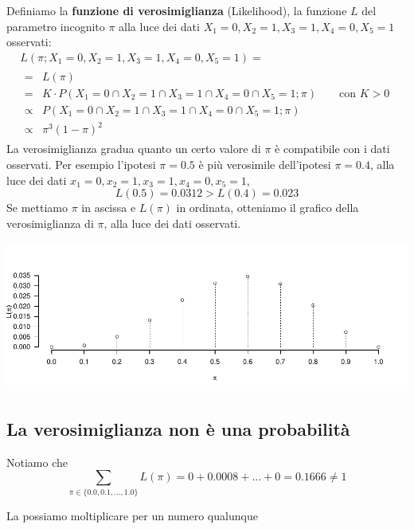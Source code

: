 \documentclass[
  11pt,
]{book}
\theoremstyle{mytheoremstyle}
\theoremstyle{mydefstyle}
\begin{document}
Definiamo la \textbf{funzione di verosimiglianza} (Likelihood), la funzione \(L\) del parametro incognito \(\pi\) alla luce dei dati \(X_1=0,X_2=1,X_3=1,X_4=0,X_5=1\) osservati:
\begin{multline*}
  L(\pi;X_1=0,X_2=1,X_3=1,X_4=0,X_5=1) =  \\
  \begin{array}{ll}
     = &L(\pi)\\
     = &K\cdot P(X_1=0\cap X_2=1\cap X_3=1\cap X_4=0\cap X_5=1;\pi) \qquad \text{con $K> 0$}\\
     \propto & P(X_1=0\cap X_2=1\cap X_3=1\cap X_4=0\cap X_5=1;\pi)\\
     \propto & \pi^3(1-\pi)^2
  \end{array}
\end{multline*}
La verosimiglianza gradua quanto un certo valore di \(\pi\) è compatibile con i dati
osservati. Per esempio l'ipotesi \(\pi=0.5\) è più verosimile dell'ipotesi \(\pi=0.4\), alla luce dei dati
\(x_1=0,x_2=1,x_3=1,x_4=0,x_5=1\),
\[
L(0.5)=0.0312>L(0.4)=0.023
\]
Se mettiamo \(\pi\) in ascissa e \(L(\pi)\) in ordinata, otteniamo il grafico della verosimiglianza di \(\pi\), alla luce dei dati osservati.

\begin{center}\includegraphics{Appunti_di_Statistica_2025_files/figure-latex/12-Verosimiglianza-4-1} \end{center}

\subsection{La verosimiglianza non è una probabilità}\label{la-verosimiglianza-non-uxe8-una-probabilituxe0}

Notiamo che
\[\sum_{\pi\in\{0.0,0.1,...,1.0\}}L(\pi) = 0+0.0008+...+0=0.1666\neq 1\]

La possiamo moltiplicare per un numero qualunque
\end{document}
